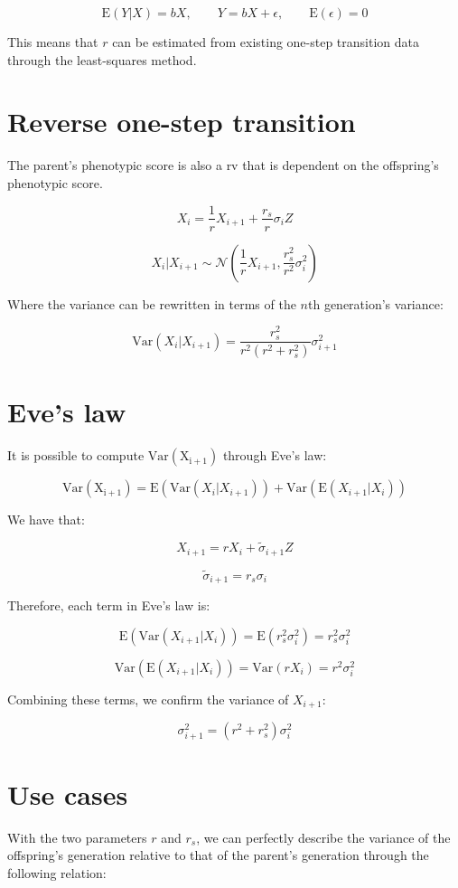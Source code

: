 \documentclass[a4paper,11pt]{article}
\begin{document}
$$\mathrm{E}(Y|X) = bX, \qquad Y = bX + \epsilon, \qquad \mathrm{E}(\epsilon) = 0 $$

This means that $r$ can be estimated from existing one-step transition data through the least-squares method. 


\section{Reverse one-step transition}
The parent's phenotypic score is also a rv that is dependent on the offspring's phenotypic score. 

$$X_i = \frac{1}{r}X_{i+1} + \frac{r_s}{r}\sigma_iZ$$


$$X_i|X_{i+1} \sim \mathcal{N}(\frac{1}{r}X_{i+1}, \frac{r_s^2}{r^2}\sigma_i^2)$$


Where the variance can be rewritten in terms of the $n$th generation's variance:

$$\mathrm{Var}(X_i|X_{i+1}) = \frac{r_s^2}{r^2(r^2+r_s^2)} \sigma_{i+1}^2$$

\section{Eve's law}
It is possible to compute $\mathrm{Var(X_{i+1})}$ through Eve's law:

$$\mathrm{Var(X_{i+1})} = \mathrm{E}(\mathrm{Var}(X_i|X_{i+1})) + \mathrm{Var}(\mathrm{E}(X_{i+1}|X_i))$$

We have that:

$$X_{i+1} = rX_i + \tilde{\sigma}_{i+1} Z$$

$$\tilde{\sigma}_{i+1} = r_s \sigma_i$$

Therefore, each term in Eve's law is:

$$\mathrm{E}(\mathrm{Var}(X_{i+1}|X_i)) = \mathrm{E}(r_s^2 \sigma_i^2) = r_s^2 \sigma_i^2$$

$$\mathrm{Var}(\mathrm{E}(X_{i+1}|X_i)) = \mathrm{Var}(rX_i) = r^2\sigma_i^2$$

Combining these terms, we confirm the variance of $X_{i+1}$:

$$\sigma_{i+1}^2 = (r^2+r_s^2)  \sigma_i^2$$





\section{Use cases}
With the two parameters $r$ and $r_s$, we can perfectly describe the variance of the offspring's generation relative to that of the parent's generation through the following relation:
\end{document}
